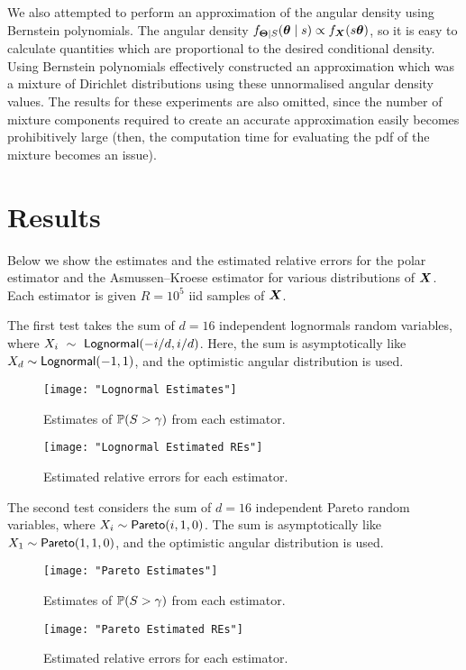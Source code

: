We also attempted to perform an approximation of the angular density using Bernstein polynomials. The angular density $f_{\bm{\Theta} \mid S}(\bm{\theta} \mid s) \propto f_{\bm{X}}(s \bm{\theta})$, so it is easy to calculate quantities which are proportional to the desired conditional density. Using Bernstein polynomials effectively constructed an approximation which was a mixture of Dirichlet distributions using these unnormalised angular density values. The results for these experiments are also omitted, since the number of mixture components required to create an accurate approximation easily becomes prohibitively large (then, the computation time for evaluating the pdf of the mixture becomes an issue).

\section{Results} \label{Sec:Results}

Below we show the estimates and the estimated relative errors for the polar estimator and the Asmussen--Kroese estimator for various distributions of $\bm{X}$. Each estimator is given $R = 10^5$ iid samples of $\bm{X}$.

The first test takes the sum of $d=16$ independent lognormals random variables, where $X_i~\sim~\mathsf{Lognormal}(-i/d, i/d)$. Here, the sum is asymptotically like $X_d \sim \mathsf{Lognormal}(-1, 1)$, and the optimistic angular distribution is used.
\begin{figure}[H]
	\centering
	\texttt{[image: "Lognormal Estimates"]}
	\caption{Estimates of $\operatorname{{\mathbb P}}(S > \gamma)$ from each estimator.}
\end{figure}

\begin{figure}[H]
	\centering
	\texttt{[image: "Lognormal Estimated REs"]}
	\caption{Estimated relative errors for each estimator.}
\end{figure}

The second test considers the sum of $d=16$ independent Pareto random variables, where $X_i \sim \mathsf{Pareto}(i, 1, 0)$. The sum is asymptotically like $X_1 \sim \mathsf{Pareto}(1, 1, 0)$, and the optimistic angular distribution is used.
\begin{figure}[H]
	\centering
	\texttt{[image: "Pareto Estimates"]}
	\caption{Estimates of $\operatorname{{\mathbb P}}(S > \gamma)$ from each estimator.}
\end{figure}

\begin{figure}[H]
	\centering
	\texttt{[image: "Pareto Estimated REs"]}
	\caption{Estimated relative errors for each estimator.}
\end{figure}


